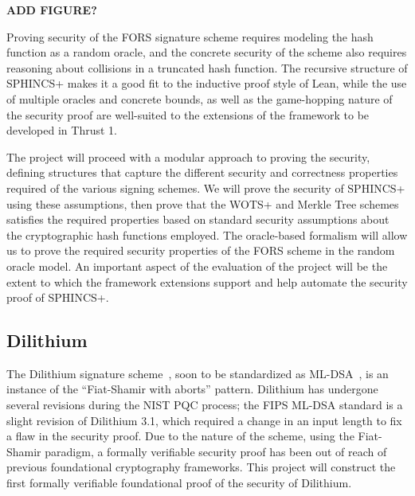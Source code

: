\textbf{ADD FIGURE?}

Proving security of the FORS signature scheme requires modeling the hash function as a random oracle, and the concrete security of the scheme also requires reasoning about collisions in a truncated hash function.  The recursive structure of SPHINCS+ makes it a good fit to the inductive proof style of Lean, while the use of multiple oracles and concrete bounds, as well as the game-hopping nature of the security proof are well-suited to the extensions of the \vcvio framework to be developed in Thrust 1.

The project will proceed with a modular approach to proving the security, defining  structures that capture the different security and correctness properties required of the various signing schemes.  
We will prove the security of SPHINCS+ using these assumptions, then prove that the WOTS+ and Merkle Tree schemes satisfies the required properties based on standard security assumptions about the cryptographic hash functions employed.
The \vcvio oracle-based formalism will allow us to prove the required security properties of the FORS scheme in the random oracle model.
An important aspect of the evaluation of the project will be the extent to which the \vcvio framework extensions support and help automate the security proof of SPHINCS+.


\subsection{Dilithium}

The Dilithium signature scheme~\cite{dilithum}, soon to be standardized as ML-DSA~\cite{ML-DSA}, is an instance of the ``Fiat-Shamir with aborts'' pattern.
Dilithium has undergone several revisions during the NIST PQC process; the FIPS ML-DSA standard is a slight revision of Dilithium 3.1, which required a change in an input length to fix a flaw in the security proof.
Due to the nature of the scheme, using the  Fiat-Shamir paradigm, a formally verifiable security proof has been out of reach of previous foundational cryptography frameworks.
This project will construct the first formally verifiable foundational proof of the security of Dilithium.

